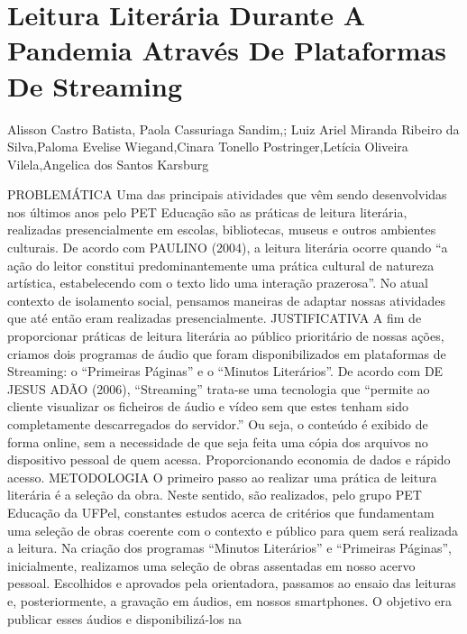 


\section*{Leitura Literária Durante A Pandemia Através De Plataformas De Streaming}

Alisson Castro Batista, Paola Cassuriaga Sandim,; Luiz Ariel Miranda Ribeiro da  Silva,Paloma Evelise Wiegand,Cinara Tonello Postringer,Letícia Oliveira Vilela,Angelica dos Santos Karsburg

PROBLEMÁTICA
Uma das principais atividades que vêm sendo desenvolvidas nos últimos anos pelo PET 
Educação são as práticas de leitura literária, realizadas presencialmente em escolas, bibliotecas, 
museus e outros ambientes culturais. De acordo com PAULINO (2004), a leitura literária ocorre 
quando “a ação do leitor constitui predominantemente uma prática cultural de natureza artística, 
estabelecendo com o texto lido uma interação prazerosa”. No atual contexto de isolamento social, 
pensamos maneiras de adaptar nossas atividades que até então eram realizadas presencialmente.
JUSTIFICATIVA
A fim de proporcionar práticas de leitura literária ao público prioritário de nossas ações, 
criamos dois programas de áudio que foram disponibilizados em plataformas de Streaming: o 
“Primeiras Páginas” e o “Minutos Literários”. De acordo com DE JESUS ADÃO (2006), 
“Streaming” trata-se uma tecnologia que “permite ao cliente visualizar os ficheiros de áudio e 
vídeo sem que estes tenham sido completamente descarregados do servidor.” Ou seja, o conteúdo 
é exibido de forma online, sem a necessidade de que seja feita uma cópia dos arquivos no 
dispositivo pessoal de quem acessa. Proporcionando economia de dados e rápido acesso.
METODOLOGIA
O primeiro passo ao realizar uma prática de leitura literária é a seleção da obra. Neste 
sentido, são realizados, pelo grupo PET Educação da UFPel, constantes estudos acerca de critérios 
que fundamentam uma seleção de obras coerente com o contexto e público para quem será 
realizada a leitura. Na criação dos programas “Minutos Literários” e “Primeiras Páginas”, 
inicialmente, realizamos uma seleção de obras assentadas em nosso acervo pessoal. Escolhidos e 
aprovados pela orientadora, passamos ao ensaio das leituras e, posteriormente, a gravação em 
áudios, em nossos smartphones. O objetivo era publicar esses áudios e disponibilizá-los na 
